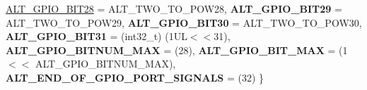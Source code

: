 \begin{DoxyCompactItemize}
\newline
\mbox{\hyperlink{group__ALT__GPIO__API__CONFIG_gga655ce0b7b808aa71b821439fd82b9796ae72b9e553a8a131c6f6f373bb648cafa}{A\+L\+T\+\_\+\+G\+P\+I\+O\+\_\+\+B\+I\+T28}} = A\+L\+T\+\_\+\+T\+W\+O\+\_\+\+T\+O\+\_\+\+P\+O\+W28, 
{\bfseries A\+L\+T\+\_\+\+G\+P\+I\+O\+\_\+\+B\+I\+T29} = A\+L\+T\+\_\+\+T\+W\+O\+\_\+\+T\+O\+\_\+\+P\+O\+W29, 
{\bfseries A\+L\+T\+\_\+\+G\+P\+I\+O\+\_\+\+B\+I\+T30} = A\+L\+T\+\_\+\+T\+W\+O\+\_\+\+T\+O\+\_\+\+P\+O\+W30, 
{\bfseries A\+L\+T\+\_\+\+G\+P\+I\+O\+\_\+\+B\+I\+T31} = (int32\+\_\+t) (1UL$<$$<$31), 
\newline
{\bfseries A\+L\+T\+\_\+\+G\+P\+I\+O\+\_\+\+B\+I\+T\+N\+U\+M\+\_\+\+M\+AX} = (28), 
{\bfseries A\+L\+T\+\_\+\+G\+P\+I\+O\+\_\+\+B\+I\+T\+\_\+\+M\+AX} = (1 $<$$<$ A\+L\+T\+\_\+\+G\+P\+I\+O\+\_\+\+B\+I\+T\+N\+U\+M\+\_\+\+M\+AX), 
{\bfseries A\+L\+T\+\_\+\+E\+N\+D\+\_\+\+O\+F\+\_\+\+G\+P\+I\+O\+\_\+\+P\+O\+R\+T\+\_\+\+S\+I\+G\+N\+A\+LS} = (32)
 \}
\end{DoxyCompactItemize}
